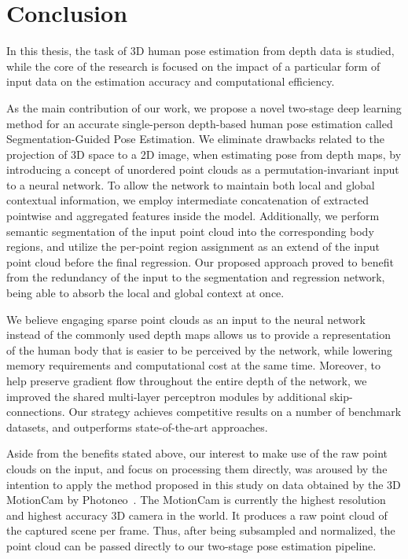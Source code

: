 \chapter{Conclusion}\label{chap:conclusion}
In this thesis, the task of 3D human pose estimation from depth data is studied, while the core of the research is focused on the impact of a particular form of input data on the estimation accuracy and computational efficiency.\par
\vspace{5mm}
\noindent
As the main contribution of our work, we propose a novel two-stage deep learning method for an accurate single-person depth-based human pose estimation called Segmentation-Guided Pose Estimation. We eliminate drawbacks related to the projection of 3D space to a 2D image, when estimating pose from depth maps, by introducing a concept of unordered point clouds as a permutation-invariant input to a neural network. To allow the network to maintain both local and global contextual information, we employ intermediate concatenation of extracted pointwise and aggregated features inside the model. Additionally, we perform semantic segmentation of the input point cloud into the corresponding body regions, and utilize the per-point region assignment as an extend of the input point cloud before the final regression. Our proposed approach proved to benefit from the redundancy of the input to the segmentation and regression network, being able to absorb the local and global context at once.\par
\vspace{5mm}
\noindent
We believe engaging sparse point clouds as an input to the neural network instead of the commonly used depth maps allows us to provide a representation of the human body that is easier to be perceived by the network, while lowering memory requirements and computational cost at the same time. Moreover, to help preserve gradient flow throughout the entire depth of the network, we improved the shared multi-layer perceptron modules by additional skip-connections. Our strategy achieves competitive results on a number of benchmark datasets, and outperforms state-of-the-art approaches.\par
\vspace{5mm}
\noindent
Aside from the benefits stated above, our interest to make use of the raw point clouds on the input, and focus on processing them directly, was aroused by the intention to apply the method proposed in this study on data obtained by the 3D MotionCam by Photoneo~\cite{photoneo}. The MotionCam is currently the highest resolution and highest accuracy 3D camera in the world. It produces a raw point cloud of the captured scene per frame. Thus, after being subsampled and normalized, the point cloud can be passed directly to our two-stage pose estimation pipeline.\par
